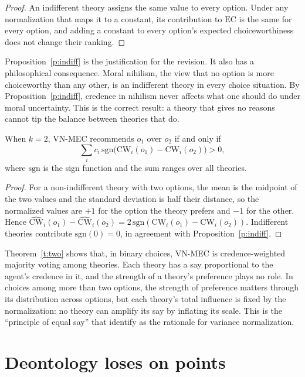 \documentclass{situationist-preprint}
\begin{document}
\begin{proof}
An indifferent theory assigns the same value to every option. Under any normalization that maps it to a constant, its contribution to $\mathrm{EC}$ is the same for every option, and adding a constant to every option's expected choiceworthiness does not change their ranking.
\end{proof}

Proposition~\ref{p:indiff} is the justification for the revision. It also has a philosophical consequence. Moral nihilism, the view that no option is more choiceworthy than any other, is an indifferent theory in every choice situation. By Proposition~\ref{p:indiff}, credence in nihilism never affects what one should do under moral uncertainty. This is the correct result: a theory that gives no reasons cannot tip the balance between theories that do.

\begin{theorem}\label{t:two}
When $k = 2$, VN-MEC recommends $o_1$ over $o_2$ if and only if
\[
\sum_{i} c_i \,\mathrm{sgn}\big(\mathrm{CW}_i(o_1) - \mathrm{CW}_i(o_2)\big) > 0,
\]
where $\mathrm{sgn}$ is the sign function and the sum ranges over all theories.
\end{theorem}

\begin{proof}
For a non-indifferent theory with two options, the mean is the midpoint of the two values and the standard deviation is half their distance, so the normalized values are $+1$ for the option the theory prefers and $-1$ for the other. Hence $\widehat{\mathrm{CW}}_i(o_1) - \widehat{\mathrm{CW}}_i(o_2) = 2\,\mathrm{sgn}(\mathrm{CW}_i(o_1) - \mathrm{CW}_i(o_2))$. Indifferent theories contribute $\mathrm{sgn}(0) = 0$, in agreement with Proposition~\ref{p:indiff}.
\end{proof}

Theorem~\ref{t:two} shows that, in binary choices, VN-MEC is credence-weighted majority voting among theories. Each theory has a say proportional to the agent's credence in it, and the strength of a theory's preference plays no role. In choices among more than two options, the strength of preference matters through its distribution across options, but each theory's total influence is fixed by the normalization: no theory can amplify its say by inflating its scale. This is the \enquote{principle of equal say} that \citet{CottonBarrattMacAskillOrd2020} identify as the rationale for variance normalization.

\section{Deontology loses on points}
\end{document}
